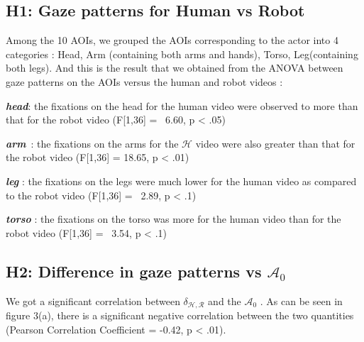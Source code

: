 \documentclass[a4,twocolumn,10pt]{article}
\newcommand{\anti}{{$\mathcal{A}_0$ }}
\begin{document}
\subsection{H1: Gaze patterns for Human vs Robot}

Among the 10 AOIs, we grouped the AOIs corresponding to the actor into 4
categories : Head, Arm (containing both arms and hands), Torso, Leg(containing
both legs). And this is the result that we obtained from the ANOVA between gaze
patterns on the AOIs versus the human and robot videos :

\textit{\textbf{head}}: the fixations on the head for the human video
were observed to more than that for the robot video (F[1,36] = \ 6.60, p
< .05)

\textit{\textbf{arm}}\ : the fixations on the arms for the $\mathcal{H}$ video
were also greater than that for the robot video (F[1,36] = 18.65, p <
.01)

\textit{\textbf{leg}}\hspace{0.18cm} : the fixations on the legs were much lower
for the human video as compared to the robot video (F[1,36] = \
2.89, p < .1)

\textit{\textbf{torso}} : the fixations on the torso was more for the
human video than for the robot video (F[1,36] = \ 3.54, p < .1) 

\subsection{H2: Difference in gaze patterns vs \anti}

We got a significant correlation between $\delta_{\mathcal{H},\mathcal{R}}$ and
the \anti. As can be seen in figure 3(a), there is a significant negative
correlation between the two quantities (Pearson Correlation Coefficient = -0.42,
p < .01).
\end{document}
